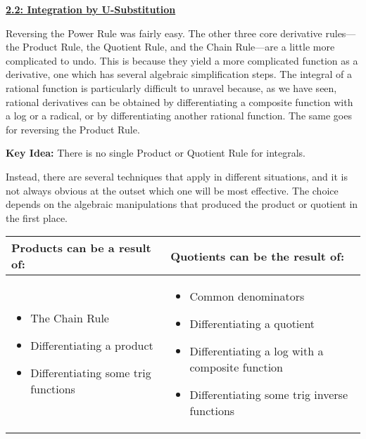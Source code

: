 \textbf{\underline{\large{2.2: Integration by U-Substitution}}} \par

Reversing the Power Rule was fairly easy. The other three core derivative rules---the Product Rule, the Quotient Rule, and the Chain Rule---are a little more complicated to undo. This is because they yield a more complicated function as a derivative, one which has several algebraic simplification steps. The integral of a rational function is particularly difficult to unravel because, as we have seen, rational derivatives can be obtained by differentiating a composite function with a log or a radical, or by differentiating another rational function. The same goes for reversing the Product Rule. \par

\textbf{Key Idea:} There is no single Product or Quotient Rule for integrals. \par

Instead, there are several techniques that apply in different situations, and it is not always obvious at the outset which one will be most effective. The choice depends on the algebraic manipulations that produced the product or quotient in the first place. \par

\begin{center} %
    \begin{table}[h!]
        \centering
        \setlength{\extrarowheight}{2pt} %
        \begin{tabular}{|>{\raggedright\arraybackslash}p{}|
                        >{\raggedright\arraybackslash}p{}|}
        \hline
        \rowcolor{gray!20}\centering\textbf{Products can be a result of:} &
        \centering\textbf{Quotients can be the result of:} \tabularnewline
        \hline
        \begin{itemize}[leftmargin=*]
            \item The Chain Rule
            \item Differentiating a product
            \item Differentiating some trig functions
        \end{itemize}
        &
        \begin{itemize}[leftmargin=*]
            \item Common denominators
            \item Differentiating a quotient
            \item Differentiating a log with a composite function
            \item Differentiating some trig inverse functions
        \end{itemize}
        \tabularnewline
        \hline
        \end{tabular}
        \end{table}
\end{center}


